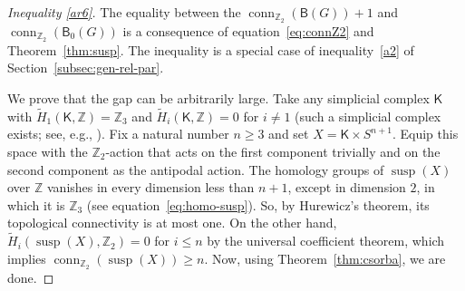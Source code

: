 \documentclass[12pt]{amsart}
\theoremstyle{definition}
\def\Z{\mathbb{Z}}
\def\K{\mathsf{K}}
\def\B{\mathsf{B}}
\renewcommand{\geq}{\geqslant}
\renewcommand{\leq}{\leqslant}
\def\susp{\operatorname{susp}}
\def\conn{\operatorname{conn}}
\begin{document}
\begin{proof}[Inequality \eqref{ar6}]
The equality between the $\conn_{\Z_2}(\B(G))+1$ and $\conn_{\Z_2}(\B_0(G))$ is a consequence of equation~\eqref{eq:connZ2} and Theorem~\ref{thm:susp}. The inequality is a special case of inequality~\eqref{a2} of Section~\ref{subsec:gen-rel-par}.

We prove that the gap can be arbitrarily large. Take any simplicial complex $\K$ with $\widetilde H_1(\K,\Z)=\Z_3$ and $\widetilde H_i(\K,\Z)=0$ for $i\neq 1$ (such a simplicial complex exists; see, e.g., \cite[Example 2.40]{hatcher2005algebraic}). Fix a natural number $n\geq 3$ and set 
$X=\K\times S^{n+1}$. Equip this space with the $\Z_2$-action that acts on the first component trivially and on the second component as the antipodal action. The homology groups of $\susp(X)$ over $\Z$ vanishes in every dimension less than $n+1$, except in dimension $2$, in which it is $\Z_3$ (see equation~\eqref{eq:homo-susp}). So, by Hurewicz's theorem, its topological connectivity is at most one. On the other hand, $\widetilde H_i(\susp(X),\Z_2)=0$ for $i\leq n$ by the universal coefficient theorem, which implies $\conn_{\Z_2}(\susp(X)) \geq n$. Now, using Theorem~\ref{thm:csorba}, we are done.
\end{proof}
\end{document}
